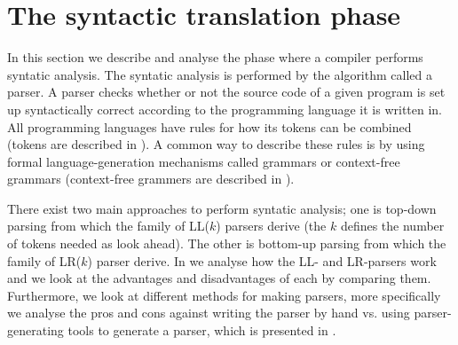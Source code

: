 \section{The syntactic translation phase}
\label{sec:syntacticanalysis}

In this section we describe and analyse the phase where a compiler performs
syntatic analysis. The syntatic analysis is performed by the algorithm called a
parser. A parser checks whether or not the source code of a given program is set
up syntactically correct according to the programming language it is written in.
All programming languages have rules for how its tokens can be combined (tokens
are described in ).  A common way to describe these
rules is by using formal language-generation mechanisms called grammars or
context-free grammars (context-free grammers are described in
). 

There exist two main approaches to perform syntatic analysis; one is top-down parsing
from which the family of LL($k$) parsers derive (the $k$ defines the number of
tokens needed as look ahead). The other is bottom-up parsing from which the
family of LR($k$) parser derive. In  we
analyse how the LL- and LR-parsers work and we look at the advantages and
disadvantages of each by comparing them. Furthermore, we look at different
methods for making parsers, more specifically we analyse the pros and cons
against writing the parser by hand vs. using parser-generating tools to generate
a parser, which is presented in .





